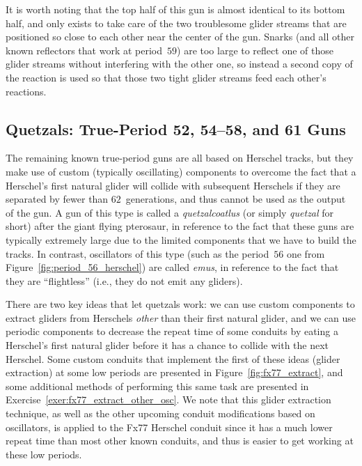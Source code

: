 It is worth noting that the top half of this gun is almost identical to its bottom half, and only exists to take care of the two troublesome glider streams that are positioned so close to each other near the center of the gun. Snarks (and all other known reflectors that work at period~$59$) are too large to reflect one of those glider streams without interfering with the other one, so instead a second copy of the reaction is used so that those two tight glider streams feed each other's reactions.


\subsection{Quetzals: True-Period 52, 54--58, and 61 Guns}\label{sec:true_period_guns_p57}

The remaining known true-period guns are all based on Herschel tracks, but they make use of custom (typically oscillating) components to overcome the fact that a Herschel's first natural glider will collide with subsequent Herschels if they are separated by fewer than $62$~generations, and thus cannot be used as the output of the gun. A gun of this type is called a \emph{quetzalcoatlus} (or simply \emph{quetzal} for short) after the giant flying pterosaur, in reference to the fact that these guns are typically extremely large due to the limited components that we have to build the tracks. In contrast, oscillators of this type (such as the period~$56$ one from Figure~\ref{fig:period_56_herschel}) are called \emph{emus}, in reference to the fact that they are ``flightless'' (i.e., they do not emit any gliders).

There are two key ideas that let quetzals work: we can use custom components to extract gliders from Herschels \emph{other} than their first natural glider, and we can use periodic components to decrease the repeat time of some conduits by eating a Herschel's first natural glider before it has a chance to collide with the next Herschel. Some custom conduits that implement the first of these ideas (glider extraction) at some low periods are presented in Figure~\ref{fig:fx77_extract}, and some additional methods of performing this same task are presented in Exercise~\ref{exer:fx77_extract_other_osc}. We note that this glider extraction technique, as well as the other upcoming conduit modifications based on oscillators, is applied to the Fx77 Herschel conduit since it has a much lower repeat time than most other known conduits, and thus is easier to get working at these low periods.


